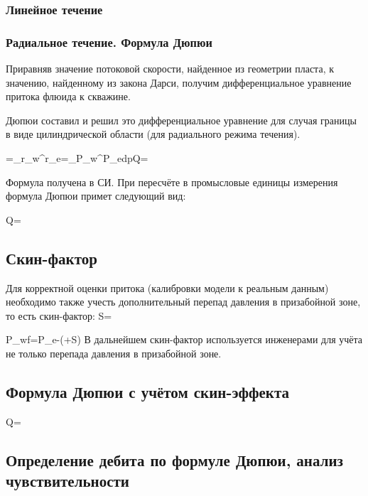 \documentclass[main.tex]{subfiles}
\begin{document}
\subsubsection{Линейное течение}


\subsubsection{Радиальное течение. Формула Дюпюи}

Приравняв значение потоковой скорости, найденное из геометрии пласта, к значению, найденному из закона Дарси, получим дифференциальное уравнение притока флюида к скважине.

Дюпюи составил и решил это дифференциальное уравнение для случая границы в виде цилиндрической области (для радиального режима течения).

\beq
{}=\Rightarrow{}\int\limits_{r_w}^{r_e}{}=\int\limits_{P_w}^{P_e}{dp}\Rightarrow Q=
\eeq

Формула получена в СИ.
При пересчёте в промысловые единицы измерения формула Дюпюи примет следующий вид:

\beq
Q=\,
\eeq


\subsection{Скин-фактор}

Для корректной оценки притока (калибровки модели к реальным данным) необходимо также учесть дополнительный перепад давления в призабойной зоне, то есть скин-фактор:
\beq
S=
\eeq

\beq
P_{wf}=P_e-\left(+S\right)
\eeq
В дальнейшем скин-фактор используется инженерами для учёта не только перепада давления в призабойной зоне.


\subsection{Формула Дюпюи с учётом скин-эффекта}

\beq
Q=
\eeq

\subsection{Определение дебита по формуле Дюпюи, анализ чувствительности}
\end{document}
